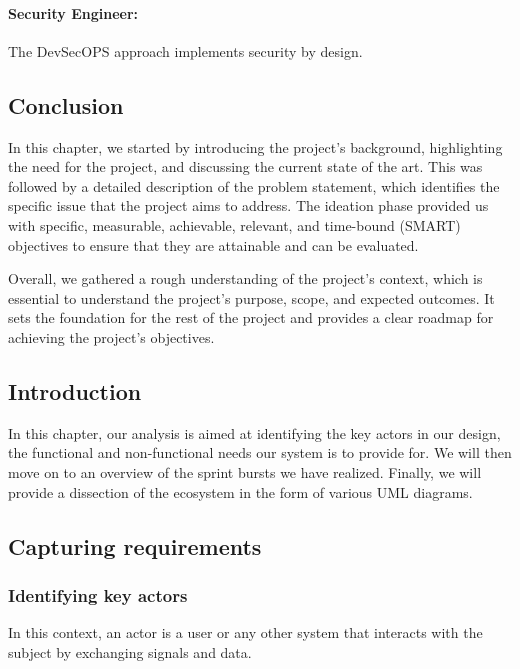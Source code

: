 \paragraph{Security Engineer: }
The DevSecOPS approach implements security by design.


\subsection*{Conclusion}

In this chapter, we started by introducing the project's background, highlighting the need for the project, and discussing the current state of the art. This was followed by a detailed description of the problem statement, which identifies the specific issue that the project aims to address. The ideation phase provided us with specific, measurable, achievable, relevant, and time-bound (SMART) objectives to ensure that they are attainable and can be evaluated. 

Overall, we gathered a rough understanding of the project's context, which is essential to understand the project's purpose, scope, and expected outcomes. It sets the foundation for the rest of the project and provides a clear roadmap for achieving the project's objectives.

\newpage

\subsection*{Introduction}
In this chapter, our analysis is aimed at identifying the key actors in our design, the functional and non-functional needs our system is to provide for. We will then move on to an overview of the sprint bursts we have realized. Finally, we will provide a dissection of the ecosystem in the form of various UML diagrams. 

\subsection{Capturing requirements}
\subsubsection{Identifying key actors}
In this context, an actor is a user or any other system that interacts with the subject by exchanging signals and data.

